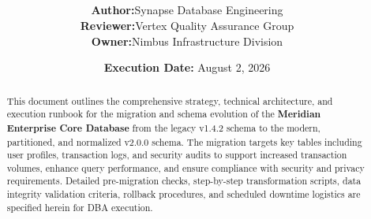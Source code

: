 \documentclass[11pt,a4paper]{article}
\title{
    \vspace{-2cm}
    \begin{tcolorbox}[
        colback=brandprimary,
        colframe=brandprimary,
        arc=4pt,
        outer arc=4pt,
        left=20pt,
        right=20pt,
        top=25pt,
        bottom=25pt,
        boxrule=0pt
    ]
        \color{white}
        \flushleft
        \noindent{\sffamily\LARGE\bfseries Meridian Enterprise Core DB \\ Schema Evolution \& Migration Plan} \\
        \vspace{0.4cm}
        \noindent{\sffamily\large Database Version: v1.4.2 $\rightarrow$ v2.0.0 -- Production Release}
    \end{tcolorbox}
    \vspace{0.4cm}
}
\author{
    \sffamily
    \begin{tabular}{l l}
        \textbf{Author:} & Synapse Database Engineering \\
        \textbf{Reviewer:} & Vertex Quality Assurance Group \\
        \textbf{Owner:} & Nimbus Infrastructure Division \\
    \end{tabular}
}
\date{
    \sffamily
    \textbf{Execution Date:} August 2, 2026
}
\begin{document}
\maketitle

\begin{abstract}
This document outlines the comprehensive strategy, technical architecture, and execution runbook for the migration and schema evolution of the \textbf{Meridian Enterprise Core Database} from the legacy v1.4.2 schema to the modern, partitioned, and normalized v2.0.0 schema. The migration targets key tables including user profiles, transaction logs, and security audits to support increased transaction volumes, enhance query performance, and ensure compliance with security and privacy requirements. Detailed pre-migration checks, step-by-step transformation scripts, data integrity validation criteria, rollback procedures, and scheduled downtime logistics are specified herein for DBA execution.
\end{abstract}

\vspace{0.4cm}
\tableofcontents
\newpage








\newpage
\nocite{*}


\end{document}
